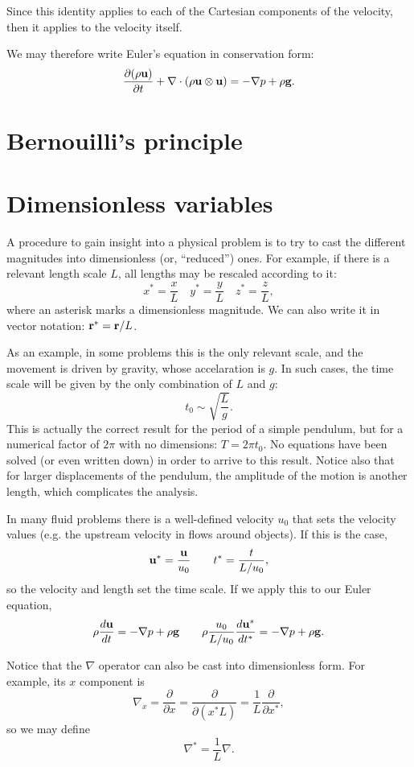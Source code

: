 Since this identity applies to each of the Cartesian components of the
velocity, then it applies to the velocity itself.

We may therefore write Euler's equation in conservation form:
\[
\frac{\partial  (\rho \mathbf{u} ) }{\partial t} +
 \nabla \cdot ( \rho \mathbf{u} \otimes \mathbf{u} ) =
 - \nabla p 
 + \rho \mathbf{g} .
\]


\section{Bernouilli's principle}




\section{Dimensionless variables}
\label{sec:Euler_adim}

A procedure to gain insight into a physical problem is to try to cast
the different magnitudes into dimensionless (or, ``reduced'')
ones. For example, if there is a relevant length scale $L$, all
lengths may be rescaled according to it:
\[
x^*=\frac{x}{L} \quad
y^*=\frac{y}{L} \quad
z^*=\frac{z}{L} ,
\]
where an asterisk marks a dimensionless magnitude. We can also write
it in vector notation: $\mathbf{r}^* = \mathbf{r} / L$.

As an example, in some problems this is the only relevant scale, and
the movement is driven by gravity, whose accelaration is $g$. In such
cases, the time scale will be given by the only combination of $L$ and
$g$:
\[
t_0 \sim \sqrt{\frac{ L }{ g }} .
\]
This is actually the correct result for the period of a simple
pendulum, but for a numerical factor of $2\pi$ with no dimensions:
$T=2\pi t_0$. No equations have been solved (or even written down) in
order to arrive to this result. Notice also that for larger
displacements of the pendulum, the amplitude of the motion is another
length, which complicates the analysis.

In many fluid problems there is a well-defined velocity $u_0$ that
sets the velocity values (e.g. the upstream velocity in flows around
objects). If this is the case,
\[
\mathbf{u}^* = \frac{\mathbf{u}}{u_0} \qquad
t^*=\frac{t}{L/u_0} ,
\]
so the velocity and length set the time scale. If we apply this to
our Euler equation,
\[
\rho \frac{d\mathbf{u} }{dt} =
- \nabla p 
+ \rho \mathbf{g}  \qquad
\rho \frac{u_0}{L/u_0} \frac{d\mathbf{u}^* }{dt^* } =
- \nabla p 
+ \rho \mathbf{g} .
\]

Notice that the $\nabla$ operator can also be cast into dimensionless
form. For example, its $x$ component is
\[
\nabla_x = \frac{\partial}{\partial x} = \frac{\partial}{\partial (x^* L) } =
\frac{ 1 }{ L } \frac{\partial}{\partial x^* },
\]
so we may define
\[
\nabla^* = \frac{ 1 }{ L } \nabla.
\]

